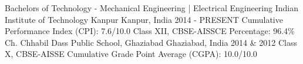 \begin{cventries}
  \cventry
    {Bachelors of Technology - Mechanical Engineering | Electrical Engineering}
    {Indian Institute of Technology Kanpur}
    {Kanpur, India}
    {2014 - PRESENT}
    {Cumulative Performance Index (CPI): 7.6/10.0}
    \cventry
    {Class XII, CBSE-AISSCE Percentage: 96.4\%}
    {Ch. Chhabil Dass Public School, Ghaziabad}
    {Ghaziabad, India}
    {2014 \& 2012}
    {Class X, CBSE-AISSE Cumulative Grade Point Average (CGPA): 10.0/10.0}
\end{cventries}
